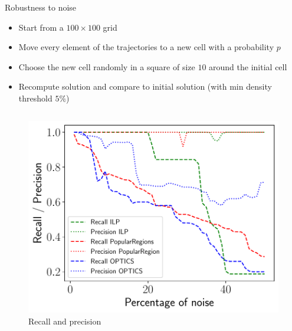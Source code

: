 \documentclass[10pt]{beamer}
\begin{document}
\begin{frame}{Robustness to noise}
    \begin{itemize}
        \item Start from a $100 \times 100$ grid
        \item Move every element of the trajectories to a new cell with a probability $p$
        \item Choose the new cell randomly in a square of size $10$ around the initial cell
        \item Recompute solution and compare to initial solution (with min density threshold $5\%$)
    \end{itemize}
    \begin{columns}[T, onlytextwidth]

        \begin{figure}
            \centering
            \includegraphics[scale=0.3]{figures/results/recall-precision.pdf}
            \caption{Recall and precision}
        \end{figure}


\end{columns}
\end{frame}
\end{document}
